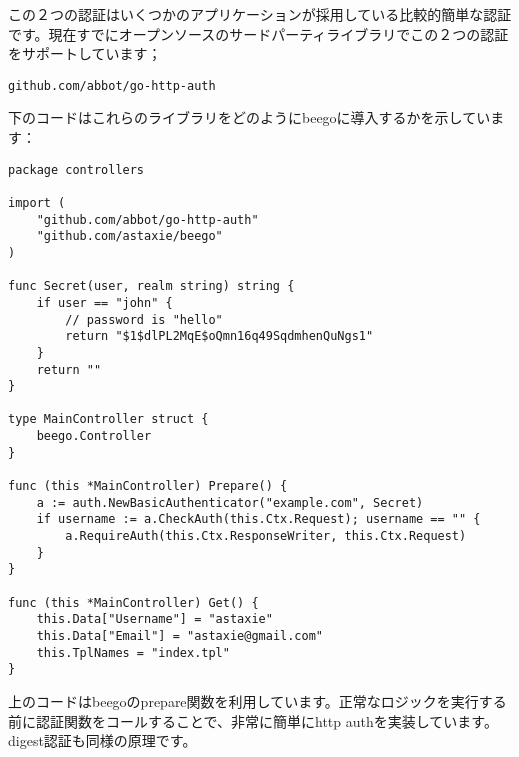 この２つの認証はいくつかのアプリケーションが採用している比較的簡単な認証です。現在すでにオープンソースのサードパーティライブラリでこの２つの認証をサポートしています；

\begin{lstlisting}[numbers=none]
github.com/abbot/go-http-auth 
\end{lstlisting}

下のコードはこれらのライブラリをどのようにbeegoに導入するかを示しています：

\begin{lstlisting}[numbers=none]
package controllers

import (
    "github.com/abbot/go-http-auth"
    "github.com/astaxie/beego"
)

func Secret(user, realm string) string {
    if user == "john" {
        // password is "hello"
        return "$1$dlPL2MqE$oQmn16q49SqdmhenQuNgs1"
    }
    return ""
}

type MainController struct {
    beego.Controller
}

func (this *MainController) Prepare() {
    a := auth.NewBasicAuthenticator("example.com", Secret)
    if username := a.CheckAuth(this.Ctx.Request); username == "" {
        a.RequireAuth(this.Ctx.ResponseWriter, this.Ctx.Request)
    }
}

func (this *MainController) Get() {
    this.Data["Username"] = "astaxie"
    this.Data["Email"] = "astaxie@gmail.com"
    this.TplNames = "index.tpl"
}
\end{lstlisting}

上のコードはbeegoのprepare関数を利用しています。正常なロジックを実行する前に認証関数をコールすることで、非常に簡単にhttp authを実装しています。digest認証も同様の原理です。

